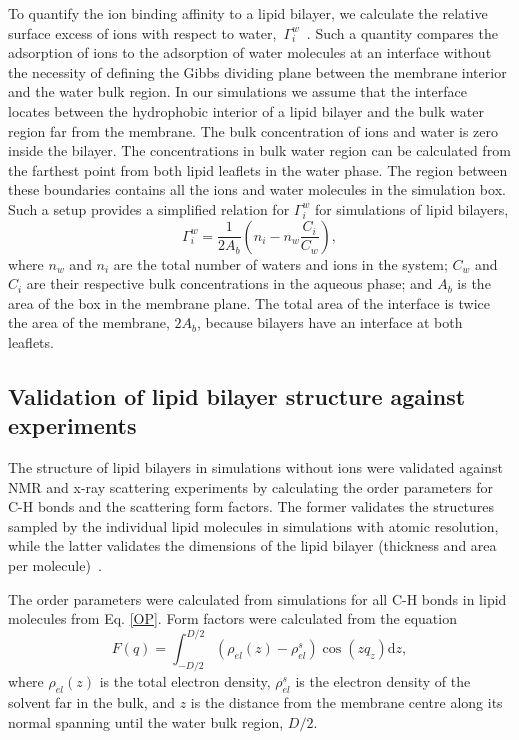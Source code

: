 \documentclass[aip,jcp,twocolumn]{revtex4}
\begin{document}
To quantify the ion binding affinity to a lipid bilayer, we
calculate the relative surface excess of ions with respect to water,~$\Gamma_i^w$~\cite{chattorajBOOK}.
Such a quantity compares the adsorption of ions to the adsorption of water molecules 
at an interface without the necessity of defining the Gibbs dividing plane 
between the membrane interior and the water bulk region. 
In our simulations we assume that the interface locates between the hydrophobic interior
of a lipid bilayer and the bulk water region far from the membrane.
The bulk concentration of ions and water is zero inside the bilayer.
The concentrations in bulk water region can be calculated from 
the farthest point from both lipid leaflets in the water phase.
The region between these boundaries contains all the ions and water
molecules in the simulation box.
Such a setup provides a simplified relation for $\Gamma_i^w$ for simulations of lipid bilayers, 
\begin{equation}\label{surfexcess}
  \Gamma_i^w=\frac{1}{2A_b} \left ( n_i - n_w \frac{C_i}{C_w} \right ) ,
\end{equation}
where $n_w$ and $n_i$ are the total number of waters and ions in the system;
$C_w$ and $C_i$ are their respective bulk concentrations in the aqueous phase;
and $A_b$ is the area of the box in the membrane plane.
The total area of the interface is twice the area of the membrane, $2A_b$,
because bilayers have an interface at both leaflets.



\subsection{Validation of lipid bilayer structure against experiments}

The structure of lipid bilayers in simulations without ions were validated against NMR and 
\mbox{x-ray} scattering experiments by calculating the order parameters
for C-H bonds and the scattering form factors. The former validates the structures sampled by the individual
lipid molecules in simulations with atomic resolution, while the latter
validates the dimensions of the lipid bilayer (thickness and area per
molecule)~\cite{ollila16}.

The order parameters were calculated from simulations for all C-H bonds
in lipid molecules from Eq. \ref{OP}. Form factors were calculated 
from the equation
\begin{equation}
  F(q) = \int _{-D/2} ^{D/2} \left ( \rho_{el}(z) - \rho_{el}^s \right ) \cos (zq_z) \mathrm{d}z,
\end{equation}
where $\rho_{el} (z)$ is the total electron density,
$\rho_{el}^s$ is the electron density of the solvent far in the bulk,
and $z$ is the distance from the membrane centre along its normal 
spanning until the water bulk region, $D/2$. 
\end{document}
